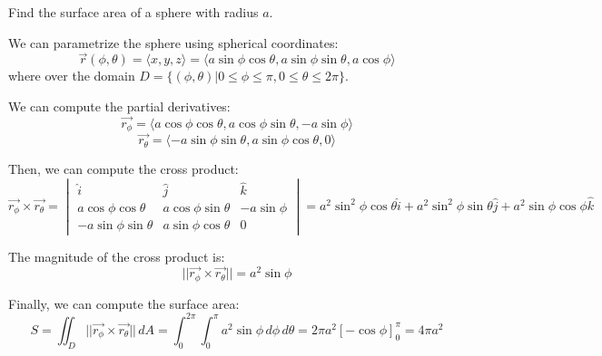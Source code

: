 \documentclass[11pt]{report}
\begin{document}
\begin{example}
    Find the surface area of a sphere with radius \(a\).

    We can parametrize the sphere using spherical coordinates:
    $$    
        \vec{r}(\phi, \theta) = \langle x, y , z \rangle = \langle a \sin \phi \cos \theta, a \sin \phi \sin \theta, a \cos \phi \rangle
    $$
    where over the domain \(D = \{(\phi, \theta) | 0 \leq \phi \leq \pi, 0 \leq \theta \leq 2\pi\}\).

    We can compute the partial derivatives:
    $$
        \vec{r_\phi} = \langle a \cos \phi \cos \theta, a \cos \phi \sin \theta, -a \sin \phi \rangle
    $$
    $$
        \vec{r_\theta} = \langle -a \sin \phi \sin \theta, a \sin \phi \cos \theta, 0 \rangle
    $$

    Then, we can compute the cross product:
    $$
        \vec{r_\phi} \times \vec{r_\theta} = 
        \begin{vmatrix}
            \hat{i} & \hat{j} & \hat{k} \\ 
            a\cos\phi\cos\theta & a\cos\phi\sin\theta & -a\sin\phi \\ 
            -a\sin\phi\sin\theta & a\sin\phi\cos\theta & 0
        \end{vmatrix}
        = a^2 \sin^2 \phi \cos \theta \hat{i} + a^2 \sin^2 \phi \sin \theta \hat{j} + a^2 \sin \phi \cos \phi \hat{k}
    $$

    The magnitude of the cross product is:
    $$
        ||\vec{r_\phi} \times \vec{r_\theta}|| = a^2 \sin \phi
    $$

    Finally, we can compute the surface area:
    $$
        S = \iint_D ||\vec{r_\phi} \times \vec{r_\theta}|| \, dA = \int_0^{2\pi} \int_0^\pi a^2 \sin \phi \, d\phi \, d\theta = 2\pi a^2 \left[ -\cos \phi \right]_0^\pi = 4\pi a^2
    $$
    
\end{example}
\end{document}
